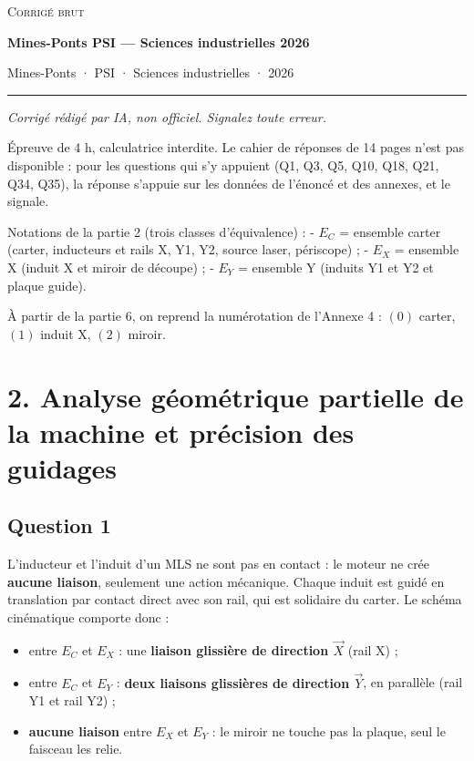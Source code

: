 \documentclass[11pt,a4paper]{article}
\providecommand{\tightlist}{\setlength{\itemsep}{0pt}\setlength{\parskip}{0pt}}
\begin{document}
\thispagestyle{plain}
\begin{center}
  {\small\scshape Corrigé brut}\par\smallskip
  {\LARGE\bfseries Mines-Ponts PSI — Sciences industrielles 2026\par}\medskip
  {\large Mines-Ponts · PSI · Sciences industrielles · 2026\par}
\end{center}
\vspace{2pt}\hrule\vspace{8pt}

\emph{Corrigé rédigé par IA, non officiel. Signalez toute erreur.}

Épreuve de 4 h, calculatrice interdite. Le cahier de réponses de 14 pages n'est pas disponible : pour les questions qui s'y appuient (Q1, Q3, Q5, Q10, Q18, Q21, Q34, Q35), la réponse s'appuie sur les données de l'énoncé et des annexes, et le signale.

Notations de la partie 2 (trois classes d'équivalence) :
- \(E_C\) = ensemble carter (carter, inducteurs et rails X, Y1, Y2, source laser, périscope) ;
- \(E_X\) = ensemble X (induit X et miroir de découpe) ;
- \(E_Y\) = ensemble Y (induits Y1 et Y2 et plaque guide).

À partir de la partie 6, on reprend la numérotation de l'Annexe 4 : \((0)\) carter, \((1)\) induit X, \((2)\) miroir.

\hypertarget{analyse-guxe9omuxe9trique-partielle-de-la-machine-et-pruxe9cision-des-guidages}{%
\section{2. Analyse géométrique partielle de la machine et précision des guidages}\label{analyse-guxe9omuxe9trique-partielle-de-la-machine-et-pruxe9cision-des-guidages}}

\hypertarget{question-1}{%
\subsection{Question 1}\label{question-1}}

L'inducteur et l'induit d'un MLS ne sont pas en contact : le moteur ne crée \textbf{aucune liaison}, seulement une action mécanique. Chaque induit est guidé en translation par contact direct avec son rail, qui est solidaire du carter. Le schéma cinématique comporte donc :

\begin{itemize}
\tightlist
\item
  entre \(E_C\) et \(E_X\) : une \textbf{liaison glissière de direction \(\vec X\)} (rail X) ;
\item
  entre \(E_C\) et \(E_Y\) : \textbf{deux liaisons glissières de direction \(\vec Y\)}, en parallèle (rail Y1 et rail Y2) ;
\item
  \textbf{aucune liaison} entre \(E_X\) et \(E_Y\) : le miroir ne touche pas la plaque, seul le faisceau les relie.
\end{itemize}
\end{document}
